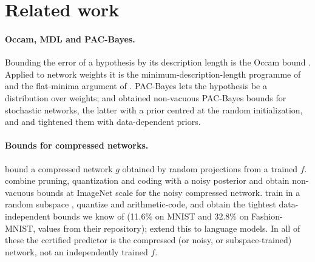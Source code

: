 \section{Related work}\label{sec:related}

\paragraph{Occam, MDL and PAC-Bayes.} Bounding the error of a hypothesis by its description length is the Occam bound \cite{blumer1987occam,langford2005tutorial}. Applied to network weights it is the minimum-description-length programme of \citet{hinton1993keeping} and the flat-minima argument of \citet{hochreiter1997flat}. PAC-Bayes \cite{mcallester1999pac} lets the hypothesis be a distribution over weights; \citet{langford2001not} and \citet{dziugaite2017computing} obtained non-vacuous PAC-Bayes bounds for stochastic networks, the latter with a prior centred at the random initialization, and \citet{perezortiz2021tighter} and \citet{dziugaite2021role} tightened them with data-dependent priors.

\paragraph{Bounds for compressed networks.} \citet{arora2018stronger} bound a compressed network $g$ obtained by random projections from a trained $f$. \citet{zhou2019nonvacuous} combine pruning, quantization and coding with a noisy posterior and obtain non-vacuous bounds at ImageNet scale for the noisy compressed network. \citet{lotfi2022pac} train in a random subspace \cite{li2018intrinsic}, quantize and arithmetic-code, and obtain the tightest data-independent bounds we know of (11.6\% on MNIST and 32.8\% on Fashion-MNIST, values from their repository); \citet{lotfi2024nonvacuous} extend this to language models. In all of these the certified predictor is the compressed (or noisy, or subspace-trained) network, not an independently trained $f$.

